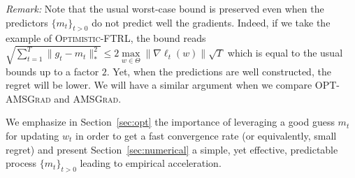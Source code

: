 \documentclass[11pt]{article}
\theoremstyle{k}
\begin{document}
\textit{Remark:} Note that the usual worst-case bound is preserved even when the predictors $\{m_{t}\}_{t>0}$ do not predict well the gradients. Indeed, if we take the example of \textsc{Optimistic-FTRL}, the bound reads $\sqrt{\sum_{t=1}^T \| g_t - m_t \|_*^2 } \leq 2 \max \limits_{w \in \Theta} \| \nabla \ell_t(w) \| \sqrt{T}$ which is equal to the usual bounds up to a factor $2$. Yet, when the predictions are well constructed, the regret will be lower. We will have a similar argument when we compare \textsc{OPT-AMSGrad} and \textsc{AMSGrad}.

We emphasize in Section~\ref{sec:opt} the importance of leveraging a good guess $m_t$ for updating $w_t$ in order to get a fast convergence rate (or equivalently, small regret) and present Section~\ref{sec:numerical} a simple, yet effective, predictable process $\{m_{t}\}_{t>0}$ leading to empirical acceleration.
\end{document}
